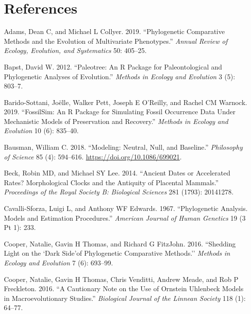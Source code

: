 \documentclass[
]{article}
\newlength{\cslhangindent}
\newenvironment{cslreferences}%
  {\setlength{\parindent}{0pt}%
  \everypar{\setlength{\hangindent}{\cslhangindent}}\ignorespaces}%
  {\par}
\begin{document}
\hypertarget{references}{%
\section*{References}\label{references}}

\hypertarget{refs}{}
\begin{cslreferences}
\leavevmode\hypertarget{ref-adams2019multivarPCM}{}%
Adams, Dean C, and Michael L Collyer. 2019. ``Phylogenetic Comparative
Methods and the Evolution of Multivariate Phenotypes.'' \emph{Annual
Review of Ecology, Evolution, and Systematics} 50: 405--25.

\leavevmode\hypertarget{ref-paleotree}{}%
Bapst, David W. 2012. ``Paleotree: An R Package for Paleontological and
Phylogenetic Analyses of Evolution.'' \emph{Methods in Ecology and
Evolution} 3 (5): 803--7.

\leavevmode\hypertarget{ref-fossilsim}{}%
Barido-Sottani, Joëlle, Walker Pett, Joseph E O'Reilly, and Rachel CM
Warnock. 2019. ``FossilSim: An R Package for Simulating Fossil
Occurrence Data Under Mechanistic Models of Preservation and Recovery.''
\emph{Methods in Ecology and Evolution} 10 (6): 835--40.

\leavevmode\hypertarget{ref-bausman2018neutral}{}%
Bausman, William C. 2018. ``Modeling: Neutral, Null, and Baseline.''
\emph{Philosophy of Science} 85 (4): 594--616.
\url{https://doi.org/10.1086/699021}.

\leavevmode\hypertarget{ref-beck2014ancient}{}%
Beck, Robin MD, and Michael SY Lee. 2014. ``Ancient Dates or Accelerated
Rates? Morphological Clocks and the Antiquity of Placental Mammals.''
\emph{Proceedings of the Royal Society B: Biological Sciences} 281
(1793): 20141278.

\leavevmode\hypertarget{ref-cavalli1967BM}{}%
Cavalli-Sforza, Luigi L, and Anthony WF Edwards. 1967. ``Phylogenetic
Analysis. Models and Estimation Procedures.'' \emph{American Journal of
Human Genetics} 19 (3 Pt 1): 233.

\leavevmode\hypertarget{ref-cooper2016dark}{}%
Cooper, Natalie, Gavin H Thomas, and Richard G FitzJohn. 2016.
``Shedding Light on the `Dark Side'of Phylogenetic Comparative
Methods.'' \emph{Methods in Ecology and Evolution} 7 (6): 693--99.

\leavevmode\hypertarget{ref-cooper2016cautionary}{}%
Cooper, Natalie, Gavin H Thomas, Chris Venditti, Andrew Meade, and Rob P
Freckleton. 2016. ``A Cautionary Note on the Use of Ornstein Uhlenbeck
Models in Macroevolutionary Studies.'' \emph{Biological Journal of the
Linnean Society} 118 (1): 64--77.


\end{cslreferences}
\end{document}
